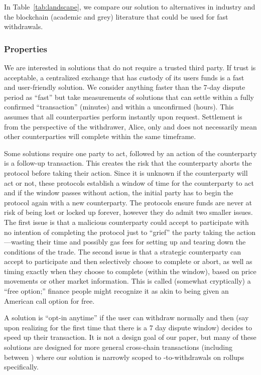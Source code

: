In Table~\ref{tab:landscape}, we compare our solution to alternatives in industry and the blockchain (academic and grey) literature that could be used for fast withdrawals.

\subsubsection{Properties} 

We are interested in solutions that do not require a trusted third party. If trust is acceptable, a centralized exchange that has custody of its users funds is a fast and user-friendly solution. We consider anything faster than the 7-day dispute period as ``fast'' but take measurements of solutions that can settle within a fully confirmed ``\layerone transaction'' (\eg minutes) and within a unconfirmed \layertwo \rblock (\eg hours). This assumes that all counterparties perform instantly upon request. Settlement is from the perspective of the withdrawer, Alice, only and does not necessarily mean other counterparties will complete within the same timeframe. 

Some solutions require one party to act, followed by an action of the counterparty is a follow-up transaction. This creates the risk that the counterparty aborts the protocol before taking their action. Since it is unknown if the counterparty will act or not, these protocols establish a window of time for the counterparty to act and if the window passes without action, the initial party has to begin the protocol again with a new counterparty. The protocols ensure funds are never at risk of being lost or locked up forever, however they do admit two smaller issues. The first issue is that a malicious counterparty could accept to participate with no intention of completing the protocol just to ``grief'' the party taking the action---wasting their time and possibly gas fees for setting up and tearing down the conditions of the trade. The second issue is that a strategic counterparty can accept to participate and then selectively choose to complete or abort, as well as timing exactly when they choose to complete (within the window), based on price movements or other market information. This is called (somewhat cryptically) a ``free option;'' finance people might recognize it as akin to being given an American call option for free. 

A solution is ``opt-in anytime'' if the user can withdraw normally and then (say upon realizing for the first time that there is a 7 day dispute window) decides to speed up their transaction. It is not a design goal of our paper, but many of these solutions are designed for more general cross-chain transactions (including between \layertwos) where our solution is narrowly scoped to \layertwo-to-\layerone withdrawals on rollups specifically.

